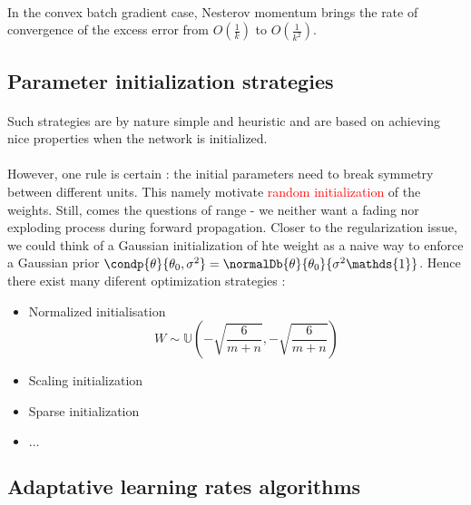 \documentclass[a4paper]{article}
\begin{document}
{{{				\paragraph{} In the convex batch gradient case, Nesterov momentum brings the rate of convergence of the excess error from $O(\frac{1}{k})$ to $O(\frac{1}{k^2})$. 
			}
		}
		\subsection{Parameter initialization strategies}
		{
			\paragraph{} Such strategies are by nature simple and heuristic and are based on achieving nice properties when the network is initialized. 
			
			
			\paragraph{} However, one rule is certain : the initial parameters need to break symmetry between different units. This namely motivate \textcolor{red}{random initialization} of the weights. Still, comes the questions of range - we neither want a fading nor exploding process during forward propagation. Closer to the regularization issue, we could think of a Gaussian initialization of hte weight as a naive way to enforce a Gaussian prior $\condp{\theta}{\theta_0,\sigma^2} = \normalDb{\theta}{\theta_0}{\sigma^2\mathds{1}}$. Hence there exist many diferent optimization strategies : 
			\begin{itemize}
				\item Normalized initialisation 
					\begin{equation}
						W \sim \mathds{U}\left(-\sqrt{\frac{6}{m+n}},-\sqrt{\frac{6}{m+n}}\right)
					\end{equation}
				\item Scaling initialization 
				\item Sparse initialization 
				\item $\hdots$
			\end{itemize}
		}
		\subsection{Adaptative learning rates algorithms}
		{
}}
\end{document}
